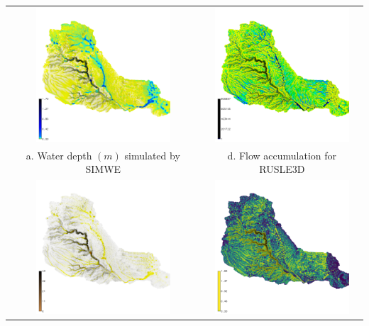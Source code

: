 \documentclass{standalone}
\begin{document}
\scriptsize
\centering 


\begin{tabular}{m{} m{}}
\multicolumn{1}{c}{\includegraphics[height=50mm]{../../images/sample_data/depth_2016.png}}&
\multicolumn{1}{c}{\includegraphics[height=50mm]{../../images/sample_data/flow_accumulation_2016.png}}\\
\multicolumn{1}{c}{a. Water depth $(m)$ simulated by SIMWE}&
\multicolumn{1}{c}{d. Flow accumulation for RUSLE3D}\\
\multicolumn{1}{c}{\includegraphics[height=50mm]{../../images/sample_data/sediment_flux_2016.png}}&
\multicolumn{1}{c}{\includegraphics[height=50mm]{../../images/sample_data/ls_factor.png}}\\

\end{tabular}
\end{document}

